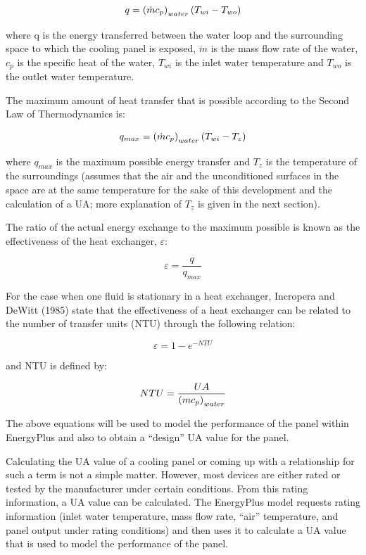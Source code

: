 \begin{equation}
q = \left(\dot{m} c_p\right)_{water} \left(T_{wi}-T_{wo}\right)
\end{equation}

where q is the energy transferred between the water loop and the surrounding space to which the cooling panel is exposed, \(\dot{m}\) is the mass flow rate of the water, \(c_p\) is the specific heat of the water, \(T_{wi}\) is the inlet water temperature and \(T_{wo}\) is the outlet water temperature.

The maximum amount of heat transfer that is possible according to the Second Law of Thermodynamics is:

\begin{equation}
q_{max} = \left(\dot{m} c_p\right)_{water} \left(T_{wi} - T_z\right)
\end{equation}

where \(q_{max}\) is the maximum possible energy transfer and \(T_z\) is the temperature of the surroundings (assumes that the air and the unconditioned surfaces in the space are at the same temperature for the sake of this development and the calculation of a UA; more explanation of \(T_z\) is given in the next section).

The ratio of the actual energy exchange to the maximum possible is known as the effectiveness of the heat exchanger, $\varepsilon$:

\begin{equation}
\varepsilon = \frac{q}{q_{max}}
\end{equation}

For the case when one fluid is stationary in a heat exchanger, Incropera and DeWitt (1985) state that the effectiveness of a heat exchanger can be related to the number of transfer units (NTU) through the following relation:

\begin{equation}
\varepsilon = 1 - e^{-NTU}
\end{equation}

and NTU is defined by:

\begin{equation}
NTU = \frac{UA}{ \left(m c_p\right)_{water} }
\end{equation}

The above equations will be used to model the performance of the panel within EnergyPlus and also to obtain a “design” UA value for the panel.

Calculating the UA value of a cooling panel or coming up with a relationship for such a term is not a simple matter.  However, most devices are either rated or tested by the manufacturer under certain conditions.  From this rating information, a UA value can be calculated.  The EnergyPlus model requests rating information (inlet water temperature, mass flow rate, “air” temperature, and panel output under rating conditions) and then uses it to calculate a UA value that is used to model the performance of the panel.

